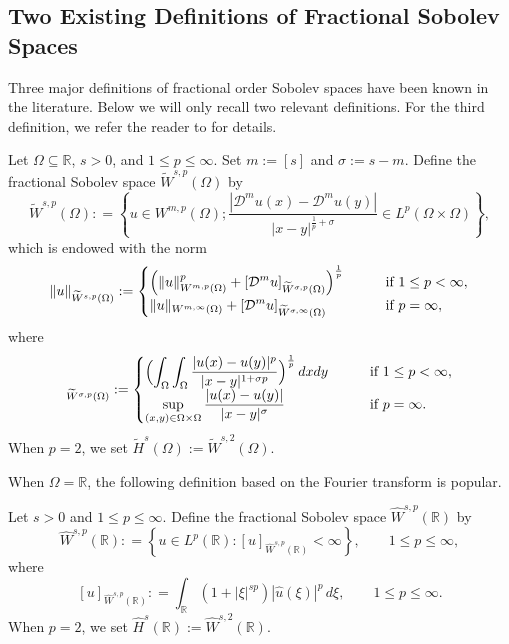 \documentclass[leqno,final]{siamltex}
\numberwithin{equation}{section}
\newcommand{\Ome}{{\Omega}}
\renewcommand{\(}{\bigl(}
\renewcommand{\)}{\bigr)}
\newcommand{\tH}{\widetilde{H}}
\newcommand{\tW}{\widetilde{W}}
\newcommand{\R}{\mathbb{R}}
\begin{document}
\subsection{Two Existing Definitions of Fractional Sobolev Spaces}\label{sec-5.1}
 Three major definitions of fractional order Sobolev spaces have been known in the literature.
 Below we will only recall two relevant definitions. For the 
 third definition, we refer the reader to \cite{Adams,Lions} for details. 

\begin{definition}
    Let $\Omega \subseteq \R$,   $s>0$, and   $1 \leq p \leq  \infty$. Set $m:=[s]$ and $\sigma:=s-m$. 
    Define the fractional Sobolev space ${\tW}^{s,p}(\Omega)$ by
    \[
    {\tW}^{s,p}(\Omega) : = \left\{ u \in W^{m,p}(\Omega) ; \dfrac{\left|\mathcal{D}^m u(x) - \mathcal{D}^m u(y) \right|}{|x- y|^{\frac{1}{p} + \sigma}} \in L^{p}(\Omega \times \Omega)\right\}, 
    \]
    which is endowed with the norm 
    \begin{align*}
    \|u\|_{{\tW}^{s,p}(\Omega)} : =\begin{cases} \displaystyle{ 
    \Bigl( \|u\|_{W^{m,p}(\Omega)}^{p} + [\mathcal{D}^m u]_{{\tW}^{\sigma,p}(\Omega) }  \Bigr)^{\frac{1}{p}} } &\qquad\mbox{if } 1\leq p< \infty, \\
    \displaystyle{  \|u\|_{W^{m,\infty}(\Omega)}  + [\mathcal{D}^m u]_{{\tW}^{\sigma,\infty}(\Omega) } }    &\qquad\mbox{if } p= \infty,
     \end{cases}
    \end{align*}
    where
    \begin{equation*}
    [u]_{{\tW}^{\sigma,p}(\Omega) }: =  \begin{cases} \displaystyle{
    \Bigl( \int_{\Omega} \int_{\Omega} \dfrac{|u(x) - u(y)|^{p}}{|x-y|^{1 + \sigma p}} \Bigr)^{\frac{1}{p}}\, dx dy }
    &\qquad\mbox{if } 1\leq p< \infty,\\
    \displaystyle{ \sup_{(x,y)\in \Omega\times \Omega} \dfrac{|u(x) - u(y)|}{|x-y|^{\sigma } } }
    &\qquad\mbox{if } p=\infty.  
    \end{cases} 
    \end{equation*}
    When $p=2$, we set ${\tH}^{s}(\Omega) := {\tW}^{s,2}(\Omega)$. 
\end{definition}

When $\Ome=\R$, the following definition based on the Fourier transform is popular.

\begin{definition}
    Let   $s>0$ and  $1 \leq p \leq  \infty$. %
     Define the fractional Sobolev space  $\widehat{W}^{s,p}(\R)$ by
    \[
    \widehat{W}^{s,p}(\R) : = \left\{ u \in L^{p}(\R) :  [u]_{\widehat{W}^{s,p}(\R)} < \infty \right\},  \qquad 1\leq p\leq  \infty,
    \]
   where 
   \[
   [u]_{\widehat{W}^{s,p}(\R)} : = \int_{\R} (1+ |\xi|^{s p}) |\hat{u} (\xi)|^{p}\,d\xi ,
   \qquad 1\leq p\leq \infty.
   \]
   When $p=2$, we set $\widehat{H}^{s}(\R) := \widehat{W}^{s,2}(\R)$.
\end{definition}
\end{document}
